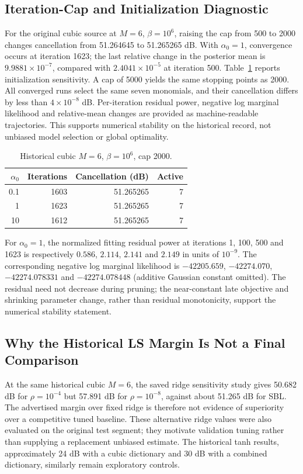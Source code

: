 \documentclass[conference]{IEEEtran}
\begin{document}
\subsection{Iteration-Cap and Initialization Diagnostic}
For the original cubic source at $M=6$, $\beta=10^6$, raising the cap from 500 to 2000 changes cancellation from 51.264645 to 51.265265 dB. With $\alpha_0=1$, convergence occurs at iteration 1623; the last relative change in the posterior mean is $9.9881\times10^{-7}$, compared with $2.4041\times10^{-5}$ at iteration 500. Table~\ref{tab:convergence} reports initialization sensitivity. A cap of 5000 yields the same stopping points as 2000. All converged runs select the same seven monomials, and their cancellation differs by less than $4\times10^{-8}$ dB. Per-iteration residual power, negative log marginal likelihood and relative-mean changes are provided as machine-readable trajectories. This supports numerical stability on the historical record, not unbiased model selection or global optimality.
\begin{table}[!t]
\caption{Historical cubic $M=6$, $\beta=10^6$, cap 2000.}\label{tab:convergence}
\centering\small
\begin{tabular}{rrrr}\toprule
$\alpha_0$ & Iterations & Cancellation (dB) & Active\\\midrule
0.1 & 1603 & 51.265265 & 7\\
1 & 1623 & 51.265265 & 7\\
10 & 1612 & 51.265265 & 7\\\bottomrule
\end{tabular}
\end{table}

For $\alpha_0=1$, the normalized fitting residual power at iterations 1, 100, 500 and 1623 is respectively $0.586$, $2.114$, $2.141$ and $2.149$ in units of $10^{-9}$. The corresponding negative log marginal likelihood is $-42205.659$, $-42274.070$, $-42274.078331$ and $-42274.078448$ (additive Gaussian constant omitted). The residual need not decrease during pruning; the near-constant late objective and shrinking parameter change, rather than residual monotonicity, support the numerical stability statement.

\subsection{Why the Historical LS Margin Is Not a Final Comparison}
At the same historical cubic $M=6$, the saved ridge sensitivity study gives 50.682 dB for $\rho=10^{-4}$ but 57.891 dB for $\rho=10^{-8}$, against about 51.265 dB for SBL. The advertised margin over fixed ridge is therefore not evidence of superiority over a competitive tuned baseline. These alternative ridge values were also evaluated on the original test segment; they motivate validation tuning rather than supplying a replacement unbiased estimate. The historical tanh results, approximately 24 dB with a cubic dictionary and 30 dB with a combined dictionary, similarly remain exploratory controls.
\end{document}
